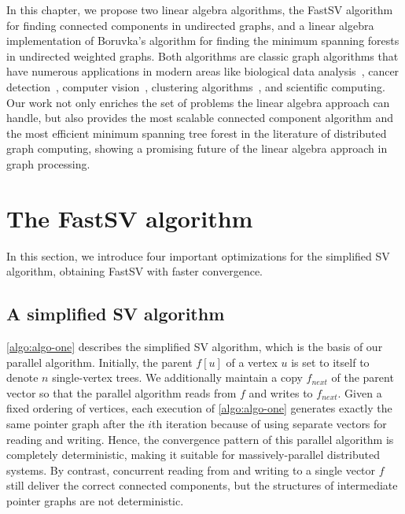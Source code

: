 \documentclass{sokendai_thesis} %
\newcommand{\boruvka}[0]{Boruvka}
\begin{document}
In this chapter, we propose two linear algebra algorithms, the FastSV algorithm for finding connected components in undirected graphs, and a linear algebra implementation of \boruvka{}'s algorithm for finding the minimum spanning forests in undirected weighted graphs.
Both algorithms are classic graph algorithms that have numerous applications in modern areas like biological data analysis~\cite{xu2002clustering,van2000graph}, cancer detection~\cite{kayser1993minimum,brinkhuis1997minimum}, computer vision~\cite{yang1989improved}, clustering algorithms~\cite{wang2009divide,zhong2010graph}, and scientific computing.
Our work not only enriches the set of problems the linear algebra approach can handle, but also provides the most scalable connected component algorithm and the most efficient minimum spanning tree forest in the literature of distributed graph computing, showing a promising future of the linear algebra approach in graph processing.


\section{The FastSV algorithm}
\label{sec:algo-two}

In this section, we introduce four important optimizations for the simplified SV algorithm, obtaining FastSV with faster convergence.

\subsection{A simplified SV algorithm }
\label{sec:algo-one}
\autoref{algo:algo-one} describes the simplified SV algorithm, which is the basis of our parallel algorithm. 
Initially, the parent $f[u]$ of a vertex $u$ is set to itself to denote $n$ single-vertex trees. 
We additionally maintain a copy $f_{\mathit{next}}$  of the parent vector so that the parallel algorithm reads from $f$ and writes to $f_{\mathit{next}}$.
Given a fixed ordering of vertices, each execution of \autoref{algo:algo-one} generates exactly the same pointer graph after the $i$th iteration because of using separate vectors for reading and writing. 
Hence, the convergence pattern of this parallel algorithm is completely deterministic, making it suitable for massively-parallel distributed systems.  
By contrast, concurrent reading from and writing to a single vector $f$ still deliver the correct connected components, but the structures of intermediate pointer graphs are not deterministic. 
\end{document}
